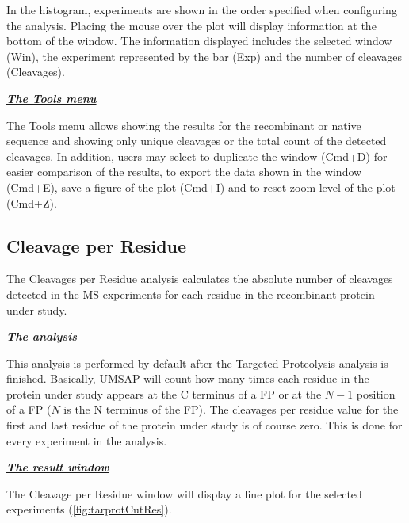 In the histogram, experiments are shown in the order specified when configuring the
analysis. Placing the mouse over the plot will display information at the bottom of
the window. The information displayed includes the selected window (Win), the experiment
represented by the bar (Exp) and the number of cleavages (Cleavages).

\textit{\textbf{\underline{The Tools menu}}}

The Tools menu allows showing the results for the recombinant or native sequence and
showing only unique cleavages or the total count of the detected cleavages. In addition,
users may select to duplicate the window (Cmd+D) for easier comparison of the results,
to export the data shown in the window (Cmd+E), save a figure of the plot (Cmd+I)
and to reset zoom level of the plot (Cmd+Z).

\subsection{Cleavage per Residue}
\label{subsec:tarprotCutsRes}
The Cleavages per Residue analysis calculates the absolute number of cleavages detected
in the MS experiments for each residue in the recombinant protein under study.

\textit{\textbf{\underline{The analysis}}}

This analysis is performed by default after the Targeted Proteolysis analysis is
finished. Basically, UMSAP will count how many times each residue in the protein
under study appears at the C terminus of a FP or at the \(N-1\) position of a FP
(\(N\) is the N terminus of the FP). The cleavages per residue value for the first
and last residue of the protein under study is of course zero. This is done for
every experiment in the analysis.

\textit{\textbf{\underline{The result window}}}

The Cleavage per Residue window will display a line plot for the selected experiments
(\autoref{fig:tarprotCutRes}).

